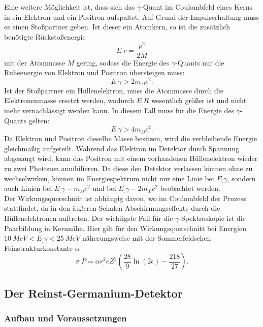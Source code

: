 Eine weitere Möglichkeit ist, dass sich das $\gamma$-Quant im Coulombfeld eines Kerns in ein Elektron und ein Positron aufspaltet. Auf Grund der Impulserhaltung muss es einen Stoßpartner geben. Ist dieser ein Atomkern, so ist die zusätzlich benötigte Rückstoßenergie 
\[
E_.r=\frac{p^2}{2M}
\]
mit der Atommasse $M$ gering, sodass die Energie des $\gamma$-Quants nur die Ruheenergie von Elektron und Positron übersteigen muss:
\[
E_.{\gamma}>2m_.0c^2\text{.}
\]
Ist der Stoßpartner ein Hüllenelektron, muss die Atommasse durch die Elektronenmasse ersetzt werden, wodurch $E_.R$ wesentlich größer ist und nicht mehr vernachlässigt werden kann.
In diesem Fall muss für die Energie des $\gamma$-Quants gelten:
\[
E_.{\gamma}>4m_.0c^2\text{.}
\]
Da Elektron und Positron dieselbe Masse besitzen, wird die verbleibende Energie gleichmäßig aufgeteilt.
Während das Elektron im Detektor durch Spannung abgesaugt wird, kann das Positron mit einem vorhandenen Hüllenelektron wieder zu zwei Photonen annihilieren.
Da diese den Detektor verlassen können ohne zu wechselwirken, können im Energiespektrum nicht nur eine Linie bei $E_.{\gamma}$, sondern auch Linien bei $E_.{\gamma}-m_.0c^2$ und bei $E_.{\gamma}-2m_.0c^2$ beobachtet werden.\\
Der Wirkungsquerschnitt ist abhängig davon, wo im Coulombfeld der Prozess stattfindet, da in den äußeren Schalen Abschirmungseffekte durch die Hüllenelektronen auftreten.
Der wichtigste Fall für die $\gamma$-Spektroskopie ist die Paarbildung in Kernnähe.
Hier gilt für den Wirkungsquerschnitt bei Energien $\SI{10}{MeV}<E_.{\gamma}<\SI{25}{MeV}$ näherungsweise mit der Sommerfeldschen Feinstrukturkonstante $\alpha$
\begin{equation}
\sigma_.P=\alpha r^2_.eZ^2\left(\frac{28}{9}\ln(2\epsilon)-\frac{218}{27}\right)\text{.}\label{eq:s_P}
\end{equation}

\subsection{Der Reinst-Germanium-Detektor}

\subsubsection{Aufbau und Voraussetzungen}

